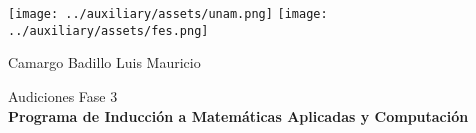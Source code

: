 \begin{titlepage}
    \begin{center}
        \texttt{[image: ../auxiliary/assets/unam.png]}
        \hspace{0.6\textwidth}
        \texttt{[image: ../auxiliary/assets/fes.png]}

        \vspace*{5cm}
        \LARGE
        \textbf{\titulo}

        \vspace{1cm}
        \large
        Camargo Badillo Luis Mauricio \\
        \vspace{1.5cm}

        \vfill

        \vspace{0.5cm}
        Audiciones Fase 3 \\
        \textbf{Programa de Inducción a Matemáticas Aplicadas y Computación}\\
    \end{center}
\end{titlepage}
